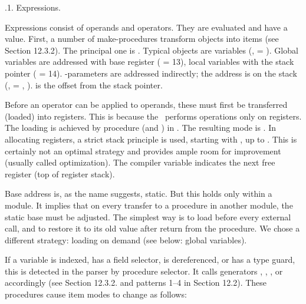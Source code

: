 .1. Expressions.

Expressions consist of operands and operators. They are evaluated and have a value. First, a number of make-procedures transform objects into items (see Section 12.3.2). The principal one is . Typical objects are variables (,  = ). Global variables are addressed with base register  ( = 13), local variables with the stack pointer  ( = 14). -parameters are addressed indirectly; the address is on the stack (,  = , ).  is the offset from the stack pointer.

Before an operator can be applied to operands, these must first be transferred (loaded) into registers. This is because the \RISC\ performs operations only on registers. The loading is achieved by procedure  (and ) in . The resulting mode is . In allocating registers, a strict stack principle is used, starting with , up to . This is certainly not an optimal strategy and provides ample room for improvement (usually called optimization). The compiler variable  indicates the next free register (top of register stack).

Base address  is, as the name suggests, static. But this holds only within a module. It implies that on every transfer to a procedure in another module, the static base must be adjusted. The simplest way is to load  before every external call, and to restore it to its old value after return from the procedure. We chose a different strategy: loading on demand (see below: global variables).

If a variable is indexed, has a field selector, is dereferenced, or has a type guard, this is detected in the parser by procedure selector. It calls generators , , , or  accordingly (see Section 12.3.2. and patterns 1--4 in Section 12.2). These procedures cause item modes to change as follows:

